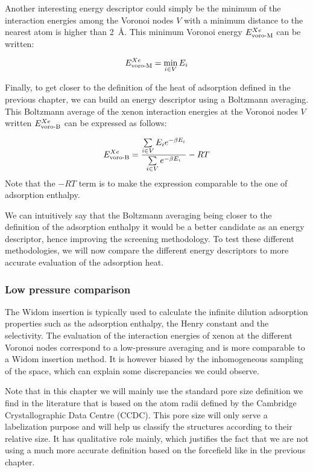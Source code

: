 \documentclass[main]{subfiles}
\begin{document}
Another interesting energy descriptor could simply be the minimum of the interaction energies among the Voronoi nodes $V$ with a minimum distance to the nearest atom is higher than \SI{2}{\angstrom}. This minimum Voronoi energy $E_{\text{voro-M}}^{Xe}$ can be written: 

\begin{equation}
    E_{\text{voro-M}}^{Xe} = \min_{i \in V} E_i
\end{equation}

Finally, to get closer to the definition of the heat of adsorption defined in the previous chapter, we can build an energy descriptor using a Boltzmann averaging. This Boltzmann average of the xenon interaction energies at the Voronoi nodes $V$ written $E_{\text{voro-B}}^{Xe}$ can be expressed as follows:

\begin{equation}
    E_{\text{voro-B}}^{Xe} = \dfrac{\sum\limits_{i \in V} E_i e^{-\beta E_i}}{\sum\limits_{i \in V} e^{-\beta E_i}} -RT
\end{equation}
Note that the $-RT$ term is to make the expression comparable to the one of adsorption enthalpy. 

We can intuitively say that the Boltzmann averaging being closer to the definition of the adsorption enthalpy it would be a better candidate as an energy descriptor, hence improving the screening methodology. To test these different methodologies, we will now compare the different energy descriptors to more accurate evaluation of the adsorption heat. 

\subsubsection{Low pressure comparison}

The Widom insertion is typically used to calculate the infinite dilution adsorption properties such as the adsorption enthalpy, the Henry constant and the selectivity. The evaluation of the interaction energies of xenon at the different Voronoi nodes correspond to a low-pressure averaging and is more comparable to a Widom insertion method. It is however biased by the inhomogeneous sampling of the space, which can explain some discrepancies we could observe.

Note that in this chapter we will mainly use the standard pore size definition we find in the literature that is based on the atom radii defined by the Cambridge Crystallographic Data Centre (CCDC). This pore size will only serve a labelization purpose and will help us classify the structures according to their relative size. It has qualitative role mainly, which justifies the fact that we are not using a much more accurate definition based on the forcefield like in the previous chapter. 
\end{document}
